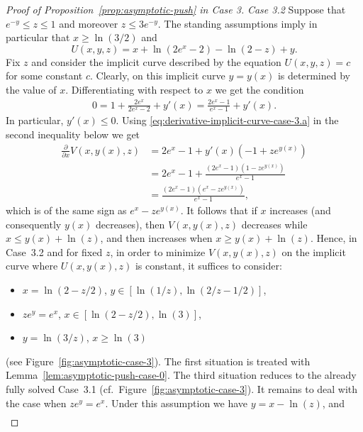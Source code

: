 \documentclass[a4paper]{amsart} %
\theoremstyle{definition}
\theoremstyle{remark}
\numberwithin{equation}{section}
\newcommand*{\XXXasymptoticDenominator}{V}
\newcommand*{\XXXasymptoticNominator}{U}
\begin{document}
\begin{proof}[Proof of Proposition~\ref{prop:asymptotic-push} in Case 3]
			
\emph{Case 3.2}
	Suppose that $e^{-y} \leq z \leq 1$ and moreover $z\leq 3e^{-y}$.
	The standing assumptions imply in particular that
	$x\geq \ln(3/2)$ and
	\begin{equation*}
	\XXXasymptoticNominator(x,y,z) = x + \ln(2e^x-2) - \ln(2-z) + y.	
	\end{equation*}
	Fix $z$ and consider the implicit curve described by the equation $\XXXasymptoticNominator(x,y,z) = c$ for some constant $c$. 
	Clearly, on this implicit curve
	$y=y(x)$ is determined by the value of $x$.
	Differentiating with respect to $x$ we
	get the condition
	\begin{align}
	\label{eq:derivative-implicit-curve-case-3.a}
	0 = 1 + \frac{2e^{x}}{2e^{x} - 2} + y'(x) =   \frac{2e^{x} - 1}{e^{x} - 1} + y'(x).
	\end{align}
	In particular, $y'(x)\leq 0$.
	Using \eqref{eq:derivative-implicit-curve-case-3.a} in the second inequality below we get
	\begin{align*}
	\frac{\partial}{\partial x} \XXXasymptoticDenominator (x, y(x), z) 
	&= 2e^{x} - 1  + y'(x)(-1  + z e^{y(x)}) \\
	&= 2e^{x} - 1 + \frac{(2e^x -1)(1-ze^{y(x)})}{e^x - 1}\\
	&= \frac{(2e^x - 1)(e^x - z e^{y(x)})}{e^x  -1},
	\end{align*}
	which is of the same sign as $e^x - ze^{y(x)}$.
	It follows that if $x$ increases (and consequently $y(x)$ decreases),
	then $\XXXasymptoticDenominator(x,y(x),z)$ decreases while $x \leq y(x) + \ln(z)$,
	and then increases when $x \geq y(x) + \ln(z)$.
	Hence, in Case~3.2 and for fixed $z$,  
	in order to minimize $\XXXasymptoticDenominator(x, y(x),z)$ on the implicit curve where $\XXXasymptoticNominator(x,y(x),z)$ is constant, it suffices to consider:
	\begin{itemize}
		\item $x=\ln(2-z/2)$, $y\in[\ln(1/z), \ln(2/z -1/2)]$,
		\item $ze^y = e^x$, $x\in [\ln(2-z/2), \ln(3)]$,
		\item $y = \ln(3/z)$, $x  \geq \ln(3)$
	\end{itemize}
	(see Figure~\ref{fig:asymptotic-case-3}).
	The first situation is treated with Lemma~\ref{lem:asymptotic-push-case-0}.
	The third situation reduces to the already fully solved Case~3.1 (cf.\ Figure~\ref{fig:asymptotic-case-3}).
	It remains to deal with the case when $ze^y =  e^x$.
	Under this assumption we have  $y = x  -\ln(z)$, and
	\begin{align*}

\end{align*}
\end{proof}
\end{document}
